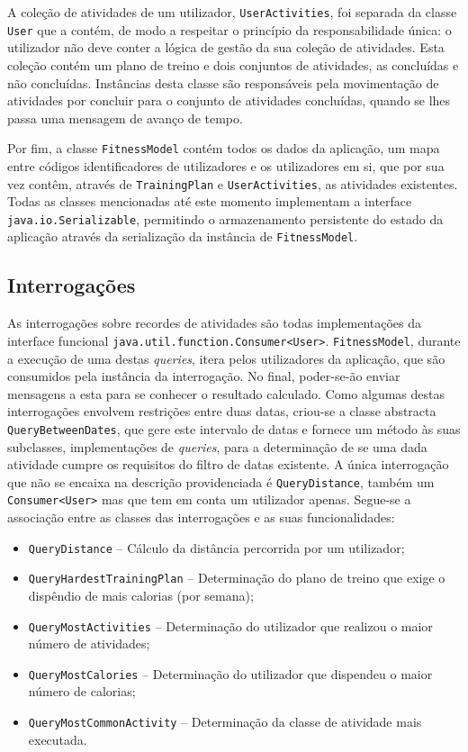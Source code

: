 \documentclass[12pt, a4paper]{article}
\begin{document}
A coleção de atividades de um utilizador, \texttt{UserActivities}, foi separada da classe
\texttt{User} que a contém, de modo a respeitar o princípio da responsabilidade única: o utilizador
não deve conter a lógica de gestão da sua coleção de atividades. Esta coleção contém um plano de
treino e dois conjuntos de atividades, as concluídas e não concluídas. Instâncias desta classe são
responsáveis pela movimentação de atividades por concluir para o conjunto de atividades concluídas,
quando se lhes passa uma mensagem de avanço de tempo.

Por fim, a classe \texttt{FitnessModel} contém todos os dados da aplicação, um mapa entre códigos
identificadores de utilizadores e os utilizadores em si, que por sua vez contêm, através de
\texttt{TrainingPlan} e \texttt{UserActivities}, as atividades existentes. Todas as classes
mencionadas até este momento implementam a interface \texttt{java.io.Serializable}, permitindo o
armazenamento persistente do estado da aplicação através da serialização da instância de
\texttt{FitnessModel}.

\subsection{Interrogações}

As interrogações sobre recordes de atividades são todas implementações da interface funcional
\texttt{java.util.function.Consumer<User>}. \texttt{FitnessModel}, durante a execução de uma destas
\emph{queries}, itera pelos utilizadores da aplicação, que são consumidos pela instância da
interrogação. No final, poder-se-ão enviar mensagens a esta para se conhecer o resultado calculado.
Como algumas destas interrogações envolvem restrições entre duas datas, criou-se a classe abstracta
\texttt{QueryBetweenDates}, que gere este intervalo de datas e fornece um método às suas subclasses,
implementações de \emph{queries}, para a determinação de se uma dada atividade cumpre os requisitos
do filtro de datas existente. A única interrogação que não se encaixa na descrição providenciada é
\texttt{QueryDistance}, também um \texttt{Consumer<User>} mas que tem em conta um utilizador apenas.
Segue-se a associação entre as classes das interrogações e as suas funcionalidades:

\begin{itemize}
    \item \texttt{QueryDistance} -- Cálculo da distância percorrida por um utilizador;
    \item \texttt{QueryHardestTrainingPlan} -- Determinação do plano de treino que exige o dispêndio
        de mais calorias (por semana);
    \item \texttt{QueryMostActivities} -- Determinação do utilizador que realizou o maior número de
        atividades;
    \item \texttt{QueryMostCalories} -- Determinação do utilizador que dispendeu o maior número de
        calorias;
    \item \texttt{QueryMostCommonActivity} -- Determinação da classe de atividade mais executada.
\end{itemize}
\end{document}
